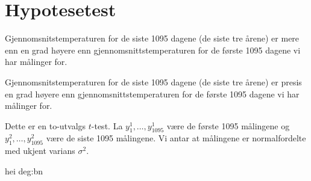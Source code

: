 \section{Hypotesetest}

\begin{hypotese}
  Gjennomsnitstemperaturen for de siste 1095 dagene (de siste tre årene)
  er mere enn en grad høyere enn gjennomsnittstemperaturen for de første 1095
  dagene vi har målinger for.
\end{hypotese}

\begin{nullhypotese}
  Gjennomsnitstemperaturen for de siste 1095 dagene (de siste tre årene)
  er presis en grad høyere enn gjennomsnittstemperaturen for de første 1095
  dagene vi har målinger for.
\end{nullhypotese}

Dette er en to-utvalgs $t$-test. La $y^1_1, \dots, y^1_{1095}$ være
de første 1095 målingene og $y^2_1, \dots, y^2_{1095}$ være de siste 1095
målingene. Vi antar at målingene er normalfordelte med ukjent varians $\sigma^2$.

hei
deg:bn
